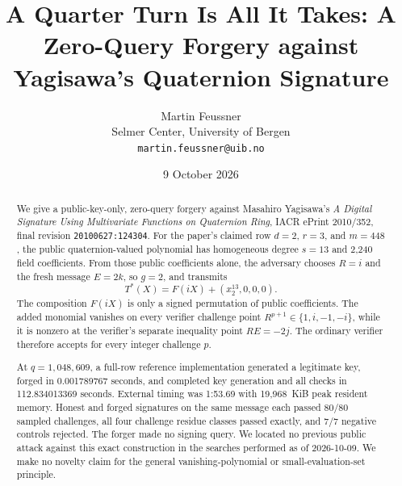 \documentclass[10pt,a4paper]{article}
\title{\bfseries A Quarter Turn Is All It Takes: A Zero-Query Forgery against Yagisawa's Quaternion Signature}
\author{Martin Feussner\\
\small Selmer Center, University of Bergen\\
\small \texttt{martin.feussner@uib.no}}
\date{9 October 2026}
\begin{document}
\maketitle

\noindent{}

\begin{abstract}
We give a public-key-only, zero-query forgery against Masahiro Yagisawa's
\emph{A Digital Signature Using Multivariate Functions on Quaternion Ring},
IACR ePrint 2010/352, final revision \texttt{20100627:124304}.  For the paper's
claimed row $d=2$, $r=3$, and $m=448$, the public quaternion-valued polynomial
has homogeneous degree $s=13$ and 2,240 field coefficients.  From those public
coefficients alone, the adversary chooses $R=i$ and the fresh message $E=2k$,
so $g=2$, and transmits
\[
  T^*(X)=F(iX)+(x_2^{13},0,0,0).
\]
The composition $F(iX)$ is only a signed permutation of public coefficients.
The added monomial vanishes on every verifier challenge point
$R^{p+1}\in\{1,i,-1,-i\}$, while it is nonzero at the verifier's separate
inequality point $RE=-2j$.  The ordinary verifier therefore accepts for every
integer challenge $p$.

At $q=1{,}048{,}609$, a full-row reference implementation generated a
legitimate key, forged in 0.001789767 seconds, and completed key generation and
all checks in 112.834013369 seconds.  External timing was 1:53.69 with
19,968~KiB peak resident memory.  Honest and forged signatures on the same
message each passed 80/80 sampled challenges, all four challenge residue
classes passed exactly, and 7/7 negative controls rejected.  The forger made
no signing query.  We located no previous public attack against this exact
construction in the searches performed as of 2026-10-09.  We make no novelty
claim for the general vanishing-polynomial or small-evaluation-set principle.
\end{abstract}
\end{document}
